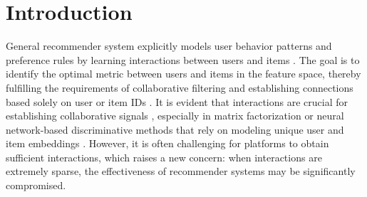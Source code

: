 \documentclass[sigconf]{acmart}
\begin{document}

\maketitle

\section{Introduction}
General recommender system \cite{ricci2011introduction} explicitly models user behavior patterns and preference rules by learning interactions between users and items \cite{rendle2009bpr}. The goal is to identify the optimal metric between users and items in the feature space, thereby fulfilling the requirements of collaborative filtering \cite{sarwar2001item, he2017neural} and establishing connections based solely on user or item IDs \cite{yuan2023go}. It is evident that interactions are crucial for establishing collaborative signals \cite{he2020lightgcn}, especially in matrix factorization \cite{rendle2009bpr} or neural network-based discriminative methods \cite{he2017neural, he2020lightgcn} that rely on modeling unique user and item embeddings \cite{chen2022thinking}. However, it is often challenging for platforms to obtain sufficient interactions, which raises a new concern: when interactions are extremely sparse, the effectiveness of recommender systems may be significantly compromised. 
\end{document}
